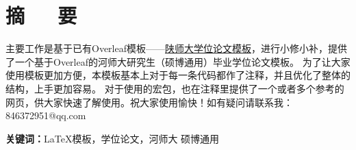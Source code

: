 \chapter{摘\ \ \  要}
\begin{spacing}{1.5}
{\songti{}
主要工作是基于已有Overleaf模板——\href{https://cn.overleaf.com/latex/templates/shan-shi-da-xue-wei-lun-wen-mo-ban/cszgkzrnfkkr}{陕师大学位论文模板}，进行小修小补，提供了一个基于Overleaf的河师大研究生（硕博通用）毕业学位论文模板。
为了让大家使用模板更加方便，本模板基本上对于每一条代码都作了注释，并且优化了整体的结构，上手更加容易。
对于使用的宏包，也在注释里提供了一个或者多个参考的网页，供大家快速了解使用。祝大家使用愉快！如有疑问请联系我：846372951@qq.com}
\end{spacing}

\textbf{关键词：}\LaTeX 模板，学位论文，河师大 硕博通用

\clearpage									%

